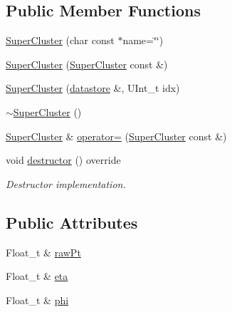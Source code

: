 \subsection*{Public Member Functions}
\begin{DoxyCompactItemize}
\item 
\hyperlink{classpanda_1_1SuperCluster_a728e325c14728f826df3d70f998f8b50}{SuperCluster} (char const $\ast$name=\char`\"{}\char`\"{})
\item 
\hyperlink{classpanda_1_1SuperCluster_a7d63e98ed439711dc6c3ac3cb478b381}{SuperCluster} (\hyperlink{classpanda_1_1SuperCluster}{SuperCluster} const \&)
\item 
\hyperlink{classpanda_1_1SuperCluster_a4de174946da9eabb94b7df435e38f13b}{SuperCluster} (\hyperlink{structpanda_1_1Element_1_1datastore}{datastore} \&, UInt\_\-t idx)
\item 
\hyperlink{classpanda_1_1SuperCluster_a5d68a5bc03396312aa59fb40ecaa7ddf}{$\sim$SuperCluster} ()
\item 
\hyperlink{classpanda_1_1SuperCluster}{SuperCluster} \& \hyperlink{classpanda_1_1SuperCluster_aba3e69a83bfcc68189c9c94e8dd36ba9}{operator=} (\hyperlink{classpanda_1_1SuperCluster}{SuperCluster} const \&)
\item 
void \hyperlink{classpanda_1_1SuperCluster_aaa4fb78fe99ff655b1a25f0e1081f2ac}{destructor} () override
\begin{DoxyCompactList}\small\item\em Destructor implementation. \item\end{DoxyCompactList}\end{DoxyCompactItemize}
\subsection*{Public Attributes}
\begin{DoxyCompactItemize}
\item 
Float\_\-t \& \hyperlink{classpanda_1_1SuperCluster_a6b6b9483d081ace5e7296cd1ddb1c41b}{rawPt}
\item 
Float\_\-t \& \hyperlink{classpanda_1_1SuperCluster_a0a4e03c8957bde5e1974d72926ff6847}{eta}
\item 
Float\_\-t \& \hyperlink{classpanda_1_1SuperCluster_ac71ce3d89fd68a59ff33ce10142d4908}{phi}
\end{DoxyCompactItemize}
